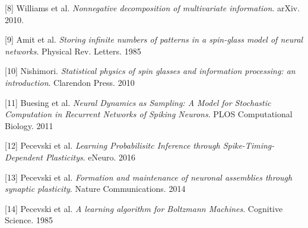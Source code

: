 \documentclass{ucetd}
\begin{document}
[8] Williams et al. \textit{Nonnegative decomposition of multivariate information}. arXiv. 2010.

[9] Amit et al. \textit{Storing infinite numbers of patterns in a spin-glass model of neural networks}. Physical Rev. Letters. 1985

[10] Nishimori. \textit{Statistical physics of spin glasses and information processing: an introduction}. Clarendon Press. 2010

[11] Buesing et al. \textit{Neural Dynamics as Sampling: A Model for Stochastic Computation in Recurrent Networks of Spiking Neurons}. PLOS Computational Biology. 2011

[12] Pecevski et al. \textit{Learning Probabilisitc Inference through Spike-Timing-Dependent Plasticitys}. eNeuro. 2016

[13] Pecevski et al. \textit{Formation and maintenance of neuronal assemblies through synaptic plasticity}. Nature Communications. 2014

[14] Pecevski et al. \textit{A learning algorithm for Boltzmann Machines}. Cognitive Science. 1985

%
%
\end{document}
